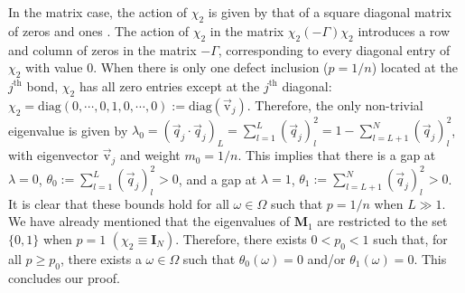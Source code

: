 \documentclass[english,12pt,jmp,graphicx]{revtex4-1}
\begin{document}
In the matrix case, the action of $\chi_2$ is given by that of a square
diagonal matrix of zeros and ones \cite{Golden:JoB:337}. The action
of $\chi_2$ in the matrix $\chi_2(-\Gamma)\chi_2$ introduces a row and column
of zeros in the matrix $-\Gamma$, corresponding to every diagonal entry of
$\chi_2$ with value 0. When there is only one defect inclusion ($p=1/n$)
located at the $j^{\text{th}}$ bond, $\chi_2$ has all zero entries except
at the $j^{\text{th}}$ diagonal:
$\chi_2=\text{diag}(0,\cdots,0,1,0,\cdots,0):=\text{diag}(\vec{\text{v}}_j)$. Therefore, 
the only non-trivial eigenvalue is given by 
$\lambda_0=(\vec{q}_j\cdot\vec{q}_j)_L=\sum_{l=1}^L(\vec{q}_j)_l^2=1-\sum_{l=L+1}^N(\vec{q}_j)_l^2$, 
with eigenvector $\vec{\text{v}}_j$ and weight $m_0=1/n$. This  
implies that there is a gap at $\lambda=0$, $\theta_0:=\sum_{l=1}^L(\vec{q}_j)_l^2>0$,
and a gap at $\lambda=1$, $\theta_1:=\sum_{l=L+1}^N(\vec{q}_j)_l^2>0$. It is clear
that these bounds hold for all $\omega\in\Omega$ such that $p=1/n$ when $L\gg1$. We
have already mentioned that the eigenvalues of $\mathbf{M}_1$ are
restricted to the set $\{0,1\}$ when $p=1$
$(\chi_2\equiv\mathbf{I}_N)$. Therefore, there exists $0<p_0<1$ such that,
for all $p\geq p_0$, there exists a $\omega\in\Omega$ such that $\theta_0(\omega)=0$ and/or
$\theta_1(\omega)=0$. This concludes our proof.


%
%
\end{document}
